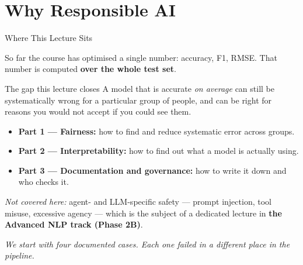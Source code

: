 \section{Why Responsible AI}

\begin{frame}{Where This Lecture Sits}

    So far the course has optimised a single number: accuracy, F1, RMSE. That number is computed
    \textbf{over the whole test set}.

    \vspace{1em}

    \begin{block}{The gap this lecture closes}
        A model that is accurate \emph{on average} can still be systematically wrong for a
        particular group of people, and can be right for reasons you would not accept if you
        could see them.
    \end{block}

    \vspace{1em}

    \begin{itemize}
        \setlength\itemsep{0.5em}
        \item \textbf{Part 1 --- Fairness:} how to find and reduce systematic error across groups.
        \item \textbf{Part 2 --- Interpretability:} how to find out what a model is actually using.
        \item \textbf{Part 3 --- Documentation and governance:} how to write it down and who checks it.
    \end{itemize}

    \vspace{0.5em}
    \centering
    \small
    \textit{Not covered here:} agent- and LLM-specific safety --- prompt injection, tool misuse,
    excessive agency --- which is the subject of a dedicated lecture in \textbf{the Advanced NLP track (Phase 2B)}.

    \vspace{0.6em}
    \normalsize
    \textit{We start with four documented cases. Each one failed in a different place in the pipeline.}
\end{frame}
